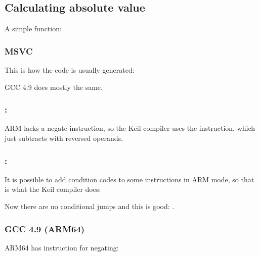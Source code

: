 \subsection{Calculating absolute value}
\label{sec:abs}

A simple function:



\subsubsection{\Optimizing MSVC}

This is how the code is usually generated:



GCC 4.9 does mostly the same.

\subsubsection{\OptimizingKeilVI: \ThumbMode}




ARM lacks a negate instruction, so the Keil compiler uses the  instruction, which just subtracts with reversed operands.

\subsubsection{\OptimizingKeilVI: \ARMMode}

It is possible to add condition codes to some instructions in ARM mode, so that is what the Keil compiler does:



Now there are no conditional jumps and this is good: .

\subsubsection{\NonOptimizing GCC 4.9 (ARM64)}


ARM64 has instruction  for negating:

